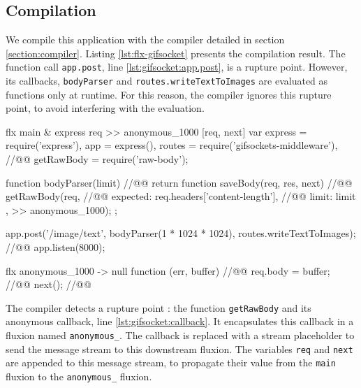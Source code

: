 \subsection{Compilation}

We compile this application with the compiler detailed in section \ref{section:compiler}.
Listing \ref{lst:flx-gifsocket} presents the compilation result.
The function call \texttt{app.post}, line \ref{lst:gifsocket:app.post}, is a rupture point.
However, its callbacks, \texttt{bodyParser} and \texttt{routes.write\-Text\-To\-Images} are evaluated as functions only at runtime.
For this reason, the compiler ignores this rupture point, to avoid interfering with the evaluation.

\begin{code}[flx, caption={Compilation result of gifsockets-server},label={lst:flx-gifsocket}]
flx main & express {req}
>> anonymous_1000 [req, next]
  var express = require('express'),
      app = express(),
      routes = require('gifsockets-middleware'), //@\label{lst:flx-gifsocket:gif-mw}@
      getRawBody = require('raw-body');

  function bodyParser(limit) { //@\label{lst:flx-gifsocket:bodyParser}@
    return function saveBody(req, res, next) { //@\label{lst:flx-gifsocket:saveBody}@
      getRawBody(req, { //@\label{lst:flx-gifsocket:getRawBody}@
        expected: req.headers['content-length'], //@\label{lst:flx-gifsocket:req.headers}@
        limit: limit
      }, >> anonymous_1000);
    };
  }

  app.post('/image/text', bodyParser(1 * 1024 * 1024), routes.writeTextToImages); //@\label{lst:flx-gifsocket:app.post}@
  app.listen(8000);

flx anonymous_1000
-> null
  function (err, buffer) { //@\label{lst:flx-gifsocket:callback}@
    req.body = buffer; //@\label{lst:flx-gifsocket:buffer}@
    next(); //@\label{lst:flx-gifsocket:next}@
  }
\end{code}

The compiler detects a rupture point : the function \texttt{get\-Raw\-Body} and its anonymous callback, line \ref{lst:gifsocket:callback}.
It encapsulates this callback in a fluxion named \texttt{anonymous\_}.
The callback is replaced with a stream placeholder to send the message stream to this downstream fluxion.
The variables \texttt{req} and \texttt{next} are appended to this message stream, to propagate their value from the \texttt{main} fluxion to the \texttt{anonymous\_} fluxion.

